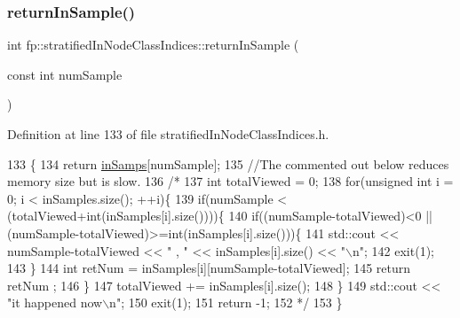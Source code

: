 \subsubsection{\texorpdfstring{return\+In\+Sample()}{returnInSample()}}
{\footnotesize\ttfamily int fp\+::stratified\+In\+Node\+Class\+Indices\+::return\+In\+Sample (\begin{DoxyParamCaption}\item[{const int}]{num\+Sample }\end{DoxyParamCaption})\hspace{0.3cm}{\ttfamily [inline]}}



Definition at line 133 of file stratified\+In\+Node\+Class\+Indices.\+h.


\begin{DoxyCode}
133                                                           \{
134                 \textcolor{keywordflow}{return} \hyperlink{classfp_1_1stratifiedInNodeClassIndices_ab6be4d82677c462494a4b4ef90c79bde}{inSamps}[numSample];
135                 \textcolor{comment}{//The commented out below reduces memory size but is slow.}
136                 \textcolor{comment}{/*}
137 \textcolor{comment}{                int totalViewed = 0;}
138 \textcolor{comment}{                for(unsigned int i = 0; i < inSamples.size(); ++i)\{}
139 \textcolor{comment}{                    if(numSample < (totalViewed+int(inSamples[i].size())))\{}
140 \textcolor{comment}{                        if((numSample-totalViewed)<0 || (numSample-totalViewed)>=int(inSamples[i].size()))\{}
141 \textcolor{comment}{                            std::cout << numSample-totalViewed << " , " << inSamples[i].size() << "\(\backslash\)n";}
142 \textcolor{comment}{                            exit(1);}
143 \textcolor{comment}{                        \}}
144 \textcolor{comment}{                        int retNum = inSamples[i][numSample-totalViewed];}
145 \textcolor{comment}{                        return retNum ;}
146 \textcolor{comment}{                    \}}
147 \textcolor{comment}{                    totalViewed += inSamples[i].size();}
148 \textcolor{comment}{                \}}
149 \textcolor{comment}{                std::cout << "it happened now\(\backslash\)n";}
150 \textcolor{comment}{                exit(1);}
151 \textcolor{comment}{                return -1;}
152 \textcolor{comment}{                */}
153             \}
\end{DoxyCode}
\mbox{\label{classfp_1_1stratifiedInNodeClassIndices_a596235ffec7250fabd2818d395b39c66}} 
